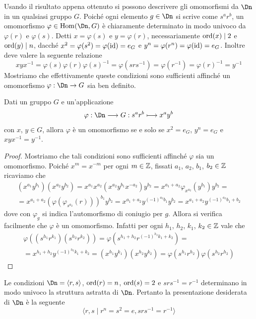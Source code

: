 \documentclass[11pt]{scrartcl}
\begin{document}
	Usando il risultato appena ottenuto si possono descrivere gli omomorfismi da $\Dn$ in 
	un qualsiasi gruppo $G$. Poiché ogni elemento $g \in \Dn$ si scrive come
	$s^ar^b$, un omomorfismo $\varphi \in \Hom(\Dn, G)$ è chiaramente
	determinato in modo univoco da $\varphi(r)$ e $\varphi(s)$. Detti $x = \varphi(s)$
	e $y = \varphi(r)$, necessariamente $\operatorname{ord}(x) \mid 2$
	e $\operatorname{ord}(y)\mid n$, dacché $x^2 = \varphi(s^2) = \varphi(\mathrm{id}) = e_G$ e
	$y^n = \varphi(r^n) = \varphi(\mathrm{id}) = e_G$. Inoltre deve valere la seguente relazione
	\[
	xyx^{-1} = \varphi(s)\varphi(r)\varphi(s)^{-1} = \varphi(srs^{-1}) = 
	\varphi(r^{-1}) = \varphi(r)^{-1} = y^{-1}
	\]Mostriamo che effettivamente queste condizioni sono sufficienti affinché un
	omomorfismo $\varphi : \Dn \to G$ sia ben definito.
	
	\begin{proposition}
		Dati un gruppo $G$ e un'applicazione
		\[
		\varphi: \Dn \longrightarrow G :s^ar^b \longmapsto x^ay^b
		\] con $x$, $y \in G$, allora $\varphi$ è un omomorfismo
		se e solo se $x^2 = e_G$, $y^n = e_G$ e $xyx^{-1} = y^{-1}$.
	\end{proposition}
	
	\begin{proof}
		Mostriamo che tali condizioni sono sufficienti affinché $\varphi$ sia un 
		omomorfismo. Poiché $x^m = x^{-m}$ per ogni $m \in \mathbb Z$, fissati 
		$a_1$, $a_2$, $b_1$, $b_2 \in \mathbb Z$ ricaviamo che 
		\begin{multline*}
			(x^{a_1}y^{b_1})(x^{a_2}y^{b_2}) = x^{a_1}x^{a_2}(x^{a_2}y^{b_1}x^{-a_2})y^{b_2} = 
			x^{a_1 + a_2}\varphi_{x^{a_2}}(y^{b_1})y^{b_2} = \\
			= x^{a_1 + a_2} (\varphi(\varphi_{s^{a_2}}(r)))^{b_1}y^{b_2} =
			x^{a_1 + a_2}y^{(-1)^{a_2}b_1}y^{b_2} = x^{a_1 + a_2}y^{(-1)^{a_2}b_1 + b_2}
		\end{multline*} dove con $\varphi_g$ si indica l'automorfismo di coniugio per $g$.
		Allora si verifica facilmente che $\varphi$ è un omomorfismo. Infatti per ogni $h_1$, $h_2$, $k_1$, $k_2 \in \mathbb Z$ vale che
		\begin{multline*}
			\varphi((s^{h_1}r^{k_1})(s^{h_2}r^{k_2})) = \varphi(s^{h_1 + h_2}r^{(-1)^{h_2}k_1 + k_2}) =\\
			= x^{h_1 + h_2}y^{(-1)^{h_2}k_1 + k_2} = (x^{h_1}y^{k_1})(x^{h_2}y^{k_2}) = 
			\varphi(s^{h_1}r^{h_2})\varphi(s^{h_2}r^{h_2})
		\end{multline*}
	\end{proof}
	
	\begin{remark}
		Le condizioni $\Dn = \langle r, s\rangle$, $\operatorname{ord}(r) = n$,
		$\operatorname{ord}(s) = 2$ e $srs^{-1} = r^{-1}$ determinano in modo univoco 
		la struttura astratta di $\Dn$. Pertanto la presentazione desiderata
		di $\Dn$ è la seguente
		\[
		\langle r, s\mid r^n = s^2 = e, srs^{-1} = r^{-1}\rangle
		\]
	\end{remark}	
	
\end{document}
